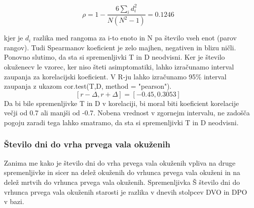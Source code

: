 \documentclass[a4paper,11pt]{article}
\begin{document}
\begin{center}
\[\rho = 1 - \frac{6\sum_{i}{}d_i^2}{N(N^2 - 1)} = 0.1246\]
\end{center} 

kjer je \( d_i \) razlika med rangoma za i-to enoto in N pa število vseh enot (parov rangov). Tudi Spearmanov koeficient je zelo majhen, negativen in blizu ničli. Ponovno slutimo, da sta si spremenljivki T in D neodvisni.
Ker je število okuženecv le vzorec, ker niso šteti asimptomatiki, lahko izračunamo interval zaupanja za korelacijski koeficient. V R-ju lahko izračunamo 95\% interval zaupanja z ukazom cor.test(T,D, method = "pearson").
\[[r - \Delta, r + \Delta] = [-0.45, 0.3053]\]
Da bi bile spremenljivke T in D v korelaciji, bi moral biti koeficient korelacije večji od 0.7 ali manjši od -0.7. Nobena vrednost v zgornejm intervalu, ne zadošča pogoju zaradi tega lahko smatramo, da sta si spremenljivki T in D neodvisni.

\subsubsection{Število dni do vrha prvega vala okuženih}

Zanima me kako je število dni do vrha prvega vala okuženih vpliva na druge spremenljivke in sicer na delež okuženih do vrhunca prvega vala okuženi in na delež mrtvih do vrhunca prvega vala okuženih. Spremenljivka Š število dni do vrhunca prvega vala okuženih starosti je razlika v dnevih
stolpcev DVO in DPO v bazi.
\end{document}

